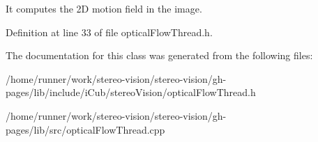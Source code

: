 It computes the 2D motion field in the image. 

Definition at line 33 of file optical\+Flow\+Thread.\+h.



The documentation for this class was generated from the following files\+:\begin{DoxyCompactItemize}
\item 
/home/runner/work/stereo-\/vision/stereo-\/vision/gh-\/pages/lib/include/i\+Cub/stereo\+Vision/optical\+Flow\+Thread.\+h\item 
/home/runner/work/stereo-\/vision/stereo-\/vision/gh-\/pages/lib/src/optical\+Flow\+Thread.\+cpp\end{DoxyCompactItemize}
